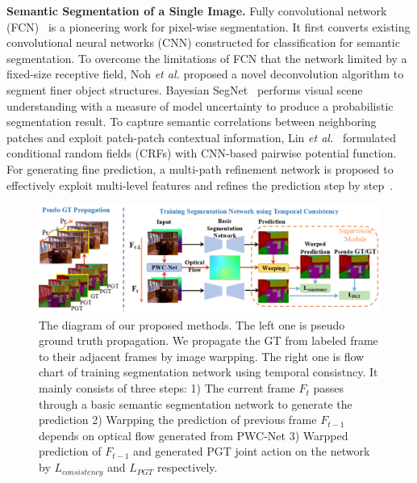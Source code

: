 \noindent \textbf{Semantic Segmentation of a Single Image.}
%
Fully convolutional network (FCN)~\cite{Long2015} is a pioneering work for pixel-wise segmentation. It first converts existing convolutional neural networks (CNN) constructed for classification for semantic segmentation.
%
To overcome the limitations of FCN that the network limited by a fixed-size receptive field, Noh \emph{et al.} \cite{Noh2015} proposed a novel deconvolution algorithm to segment finer object structures.
%
Bayesian SegNet~\cite{Kendall2015} performs visual scene understanding with a measure of model uncertainty to produce a probabilistic segmentation result.
%
To capture semantic correlations between neighboring patches and exploit patch-patch contextual information, Lin \emph{et al.}~\cite{Lin2016} formulated conditional random fields (CRFs) with CNN-based pairwise potential function. 
%
For generating fine prediction, a multi-path refinement network is proposed to effectively exploit multi-level features and refines the prediction step by step~\cite{Lin2017}.
%


\begin{figure}[htbp]
	\vspace{-0.6cm}
	\setlength{\abovecaptionskip}{0pt} 
	\setlength{\belowcaptionskip}{10pt}
	\centering
	\centering
	\includegraphics[scale=0.57]{figure/Pipeline.png}
	\vspace*{-0.8cm} 
	\caption{The diagram of our proposed methods. The left one is pseudo ground truth propagation. We propagate the GT from labeled frame to their adjacent frames by image warpping. The right one is flow chart of training segmentation network using temporal consistncy. It mainly consists of three steps: 1) The current frame $F_t$ passes through a basic semantic segmentation network to generate the prediction  2) Warpping the prediction of previous frame $F_{t-1}$ depends on optical flow generated from PWC-Net \cite{Sun2018} 3) Warpped prediction of $F_{t-1}$ and generated PGT joint action on the network by $L_{consistency}$ and $L_{PGT}$ respectively.}
	\label{fig:Pipeline}
	\vspace*{-0.2cm}
\end{figure}
 

